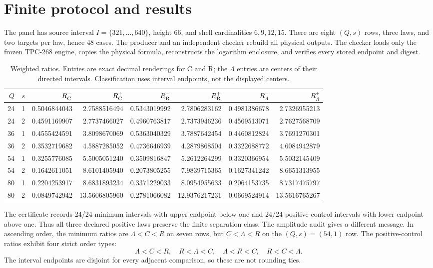 \documentclass[10pt,a4paper]{article}
\begin{document}
\section{Finite protocol and results}

The panel has source interval $I=\{321,\ldots,640\}$, height $66$, and shell
cardinalities $6,9,12,15$.  There are eight $(Q,s)$ rows, three laws, and two
targets per law, hence 48 cases.  The producer and an independent checker
rebuild all physical outputs.  The checker loads only the frozen TPC-268
engine, copies the physical formula, reconstructs the logarithm enclosure,
and verifies every stored endpoint and digest.

\begin{table}[t]
\centering\scriptsize
\caption{Weighted ratios.  Entries are exact decimal renderings for C and R;
the $\Lambda$ entries are centers of their directed intervals.  Classification
uses interval endpoints, not the displayed centers.}
\label{tab:ratios}
\begin{tabular}{rrrrrrrr}
\toprule
$Q$ & $s$ & $R_{\rm C}^-$ & $R_{\rm C}^+$ & $R_{\rm R}^-$ & $R_{\rm R}^+$
& $R_{\Lambda}^-$ & $R_{\Lambda}^+$\\
\midrule
24 & 1 & 0.5046844043 & 2.7588516494 & 0.5343019992 & 2.7806283162 & 0.4981386678 & 2.7326955213\\
24 & 2 & 0.4591169907 & 2.7737466027 & 0.4960763817 & 2.7373946236 & 0.4569513071 & 2.7627568709\\
36 & 1 & 0.4555424591 & 3.8098670069 & 0.5363040329 & 3.7887642454 & 0.4460812824 & 3.7691270301\\
36 & 2 & 0.3532719682 & 4.5887285052 & 0.4736646939 & 4.2879868504 & 0.3322688772 & 4.6084942879\\
54 & 1 & 0.3255776085 & 5.5005051240 & 0.3509816847 & 5.2612264299 & 0.3320366954 & 5.5032145409\\
54 & 2 & 0.1642611051 & 8.6101405940 & 0.2073805255 & 7.9839715365 & 0.1627341242 & 8.6651313955\\
80 & 1 & 0.2204253917 & 8.6831893234 & 0.3371229033 & 8.0954955633 & 0.2064153735 & 8.7317475797\\
80 & 2 & 0.0849742942 & 13.5606805960 & 0.2781066082 & 12.9376217231 & 0.0669524914 & 13.5616765267\\
\bottomrule
\end{tabular}
\end{table}

The certificate records 24/24 minimum intervals with upper endpoint below one
and 24/24 positive-control intervals with lower endpoint above one.  Thus all
three declared positive laws preserve the finite separation class.  The
amplitude audit gives a different message.  In ascending order, the minimum
ratios are $\Lambda<C<R$ on seven rows, but $C<\Lambda<R$ on the
$(Q,s)=(54,1)$ row.  The positive-control ratios exhibit four strict order
types:
\[
 \Lambda<C<R,\quad R<\Lambda<C,\quad
 \Lambda<R<C,\quad R<C<\Lambda.
\]
The interval endpoints are disjoint for every adjacent comparison, so these
are not rounding ties.
\end{document}
